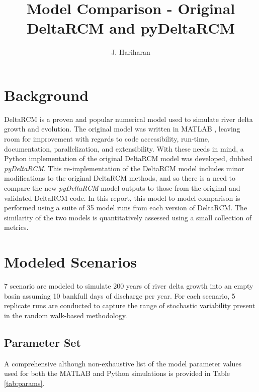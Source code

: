 \documentclass[a4paper]{article}
\title{Model Comparison - Original DeltaRCM and pyDeltaRCM}
\author{J. Hariharan}
\begin{document}
\maketitle

\tableofcontents
\clearpage

\section{Background}
DeltaRCM \cite{Liang2015a,Liang2015} is a proven \cite{Liang2015,Liang2016a} and popular \cite{Liang2016,Lauzon2018, Lauzon2019,Piliouras2021} numerical model used to simulate river delta growth and evolution.
The original model was written in MATLAB \cite{MATLAB:R2019b_u4}, leaving room for improvement with regards to code accessibility, run-time, documentation, parallelization, and extensibility.
With these needs in mind, a Python \cite{PythonSoftwareFoundation2016} implementation of the original DeltaRCM model was developed, dubbed \textit{pyDeltaRCM}.
This re-implementation of the DeltaRCM model includes minor modifications to the original DeltaRCM methods, and so there is a need to compare the new \textit{pyDeltaRCM} model outputs to those from the original and validated DeltaRCM code. 
In this report, this model-to-model comparison is performed using a suite of 35 model runs from each version of DeltaRCM.
The similarity of the two models is quantitatively assessed using a small collection of metrics.

\section{Modeled Scenarios}
7 scenario are modeled to simulate 200 years of river delta growth into an empty basin assuming 10 bankfull days of discharge per year.
For each scenario, 5 replicate runs are conducted to capture the range of stochastic variability present in the random walk-based methodology.

\subsection{Parameter Set}
A comprehensive although non-exhaustive list of the model parameter values used for both the MATLAB and Python simulations is provided in Table \ref{tab:params}.
\end{document}
